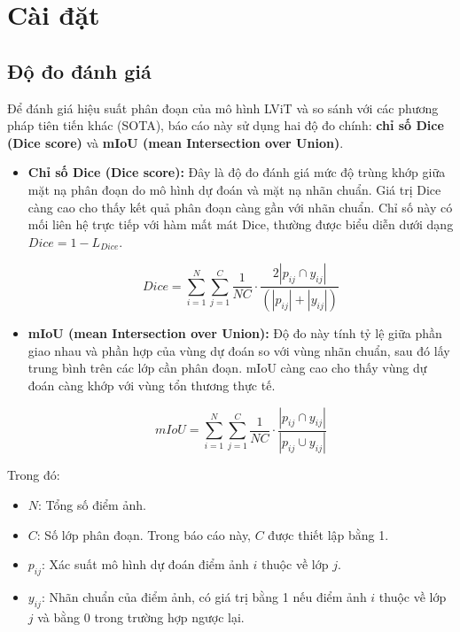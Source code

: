 \chapter{Cài đặt}
\label{Chapter4}
\setcounter{secnumdepth}{5}

\section{Độ đo đánh giá}

Để đánh giá hiệu suất phân đoạn của mô hình LViT và so sánh với các phương pháp tiên tiến khác (SOTA), báo cáo này sử dụng hai độ đo chính: \textbf{chỉ số Dice (Dice score)} và \textbf{mIoU (mean Intersection over Union)}.

\begin{itemize}
    \item \textbf{Chỉ số Dice (Dice score):} Đây là độ đo đánh giá mức độ trùng khớp giữa mặt nạ phân đoạn do mô hình dự đoán và mặt nạ nhãn chuẩn. Giá trị Dice càng cao cho thấy kết quả phân đoạn càng gần với nhãn chuẩn. Chỉ số này có mối liên hệ trực tiếp với hàm mất mát Dice, thường được biểu diễn dưới dạng $Dice = 1 - L_{Dice}$.

    \[
        Dice = \sum_{i=1}^{N} \sum_{j=1}^{C} \frac{1}{NC} \cdot \frac{2 | p_{ij} \cap y_{ij}|}{(|p_{ij}| + |y_{ij}|)}
    \]

    \item \textbf{mIoU (mean Intersection over Union):} Độ đo này tính tỷ lệ giữa phần giao nhau và phần hợp của vùng dự đoán so với vùng nhãn chuẩn, sau đó lấy trung bình trên các lớp cần phân đoạn. mIoU càng cao cho thấy vùng dự đoán càng khớp với vùng tổn thương thực tế.

    \[
        mIoU = \sum_{i=1}^{N} \sum_{j=1}^{C} \frac{1}{NC} \cdot \frac{|p_{ij} \cap y_{ij}|}{| p_{ij} \cup y_{ij}|}
    \]
\end{itemize}

Trong đó:
\begin{itemize}
    \item \textbf{$N$}: Tổng số điểm ảnh.
    \item \textbf{$C$}: Số lớp phân đoạn. Trong báo cáo này, $C$ được thiết lập bằng 1.
    \item \textbf{$p_{ij}$}: Xác suất mô hình dự đoán điểm ảnh $i$ thuộc về lớp $j$.
    \item \textbf{$y_{ij}$}: Nhãn chuẩn của điểm ảnh, có giá trị bằng 1 nếu điểm ảnh $i$ thuộc về lớp $j$ và bằng 0 trong trường hợp ngược lại.
\end{itemize}

